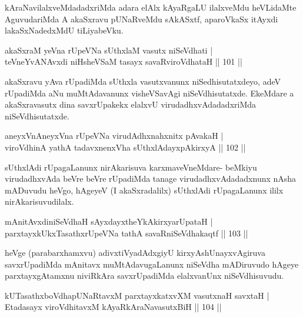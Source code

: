 \begin{artha}
kAraNavilalxveMdadadxriMda adara elAlx kAyaRgaLU ilalxveMdu heVLidaMte AguvudariMda A akaSxravu pUNaRveMdu sAkASxtf, aparoVkaSx itAyxdi lakaSxNadedxMdU tiLiyabeVku.
\end{artha}

\begin{shl}
akaSxraM yeVna rUpeVNa sUthxlaM vasutx niSeVdhati |\\
teVneYvANAvxdi niHsheVSaM tasayx savaRviroVdhataH \hfill || 101 ||
\end{shl}

\begin{artha}
akaSxravu yAva rUpadiMda sUthxla vasutxvanunx niSedhisutatxdeyo, adeV rUpadiMda aNu muMtAdavanunx visheVSavAgi niSeVdhisutatxde. EkeMdare a akaSxravasutx dina savxrUpakekx elalxvU virudadhxvAdadadxriMda niSeVdhisutatxde.
\end{artha}

\begin{shl}
aneyxVnAneyxVna rUpeVNa virudAdhxnahxnitx pAvakaH |\\
viroVdhinA yathA tadavxnenxVha sUthxlAdayxpAkirxyA \hfill || 102 ||
\end{shl}

\begin{artha}%
sUthxlAdi rUpagaLanunx nirAkarisuva karxmaveVneMdare- beMkiyu virudadhxvAda beVre beVre rUpadiMda tanage virudadhxvAdadadxnunx nAsha mADuvudu heVgo, hAgeyeV (I akaSxradalilx) sUthxlAdi rUpagaLanunx ililx nirAkarisuvudilalx.
\end{artha}

\begin{shl}
mAnitAvxdiniSeVdhaH sAyxdayxtheYkAkirxyarUpataH |\\
parxtayxkUkxTasathxrUpeVNa tathA savaRniSeVdhakaqtf \hfill || 103 ||
\end{shl}

\begin{artha}
heVge (parabarxhamxvu) adivxtiVyadAdxgiyU kirxyAshUnayxvAgiruva savxrUpadiMda mAnitavx muMtAdavugaLanunx niSeVdha mADiruvudo hAgeye parxtayxgAtamxnu niviRkAra savxrUpadiMda elalxvanUnx niSeVdhisuvudu.
\end{artha}


\begin{shl}
kUTasathxboVdhapUNaRtavxM parxtayxkatxvXM vasutxnaH savxtaH |\\
Etadasayx viroVdhitavxM kAyaRkAraNavasutxBiH \hfill || 104 ||
\end{shl}

